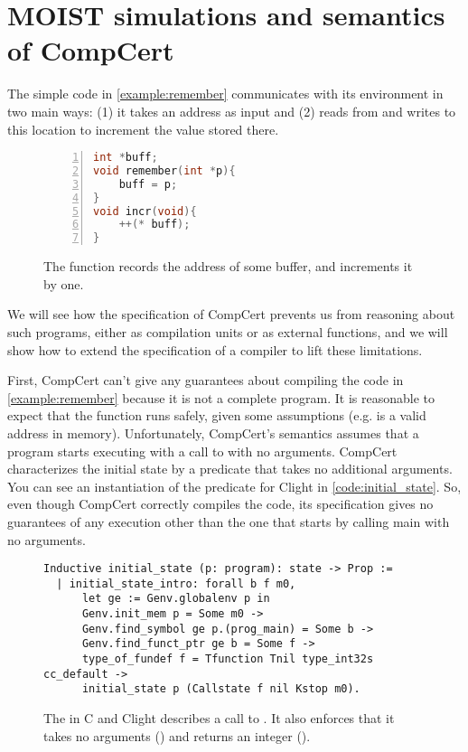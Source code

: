 \chapter{ %
MOIST simulations and semantics of CompCert}\label{ch:compcert}

The simple code in \autoref{example:remember} communicates with its environment in two main ways: (1) it takes an address as input and (2) reads from and writes to this location to increment the value stored there.
\begin{figure}\begin{lstlisting}[language=C, numbers=left]
int *buff;
void remember(int *p){
    buff = p;
}
void incr(void){
    ++(* buff);
}
\end{lstlisting}
\caption[Code example:  and ]{The function  records the address of some buffer, and  increments it by one. }
\label{example:remember}
\end{figure}
We will see how the specification of CompCert prevents us from reasoning about such programs, either as compilation units or as external functions, and we will show how to extend the specification of a compiler to lift these limitations.

First, CompCert can't give any guarantees about compiling the code in \autoref{example:remember} because it is not a complete program. It is reasonable to expect that the function  runs safely, given some assumptions (e.g.  is a valid address in memory). Unfortunately, CompCert's semantics assumes that a program starts executing with a call to   with no arguments. CompCert characterizes the initial state by a predicate  that takes no additional arguments. You can see an instantiation of the predicate for Clight in \autoref{code:initial_state}. So, even though CompCert correctly compiles the code, its specification gives no guarantees of any execution other than the one that starts by calling main with no arguments.
\begin{figure}
\begin{lstlisting}
Inductive initial_state (p: program): state -> Prop :=
  | initial_state_intro: forall b f m0,
      let ge := Genv.globalenv p in
      Genv.init_mem p = Some m0 ->
      Genv.find_symbol ge p.(prog_main) = Some b ->
      Genv.find_funct_ptr ge b = Some f ->
      type_of_fundef f = Tfunction Tnil type_int32s cc_default ->
      initial_state p (Callstate f nil Kstop m0).
\end{lstlisting}
\caption[ predicate for C]{The  in C and Clight describes a call to . It also enforces that it takes no arguments () and returns an integer ().}\label{code:initial_state}
\end{figure}

